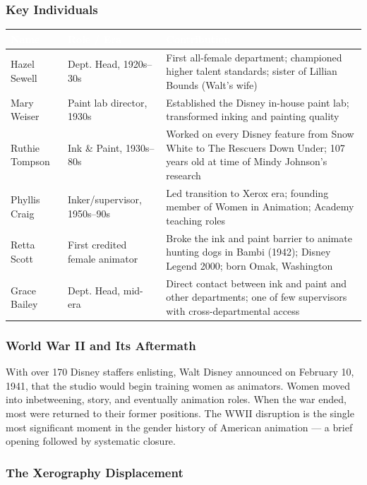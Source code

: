\documentclass[11pt,letterpaper]{article}
\newcommand{\tableheader}[1]{\textbf{\sffamily\textcolor{white}{#1}}}
\begin{document}
\subsubsection{Key Individuals}

\begin{center}
\begin{tabularx}{\textwidth}{L{3cm}L{2.5cm}X}
\toprule
{}
\tableheader{Name} & \tableheader{Role / Era} & \tableheader{Contribution} \\
\midrule
Hazel Sewell & Dept. Head, 1920s--30s & First all-female department; championed higher talent standards; sister of Lillian Bounds (Walt's wife) \\
Mary Weiser & Paint lab director, 1930s & Established the Disney in-house paint lab; transformed inking and painting quality \\
Ruthie Tompson & Ink \& Paint, 1930s--80s & Worked on every Disney feature from Snow White to The Rescuers Down Under; 107 years old at time of Mindy Johnson's research \\
Phyllis Craig & Inker/supervisor, 1950s--90s & Led transition to Xerox era; founding member of Women in Animation; Academy teaching roles \\
Retta Scott & First credited female animator & Broke the ink and paint barrier to animate hunting dogs in Bambi (1942); Disney Legend 2000; born Omak, Washington \\
Grace Bailey & Dept. Head, mid-era & Direct contact between ink and paint and other departments; one of few supervisors with cross-departmental access \\
\bottomrule
\end{tabularx}
\end{center}

\subsubsection{World War II and Its Aftermath}

With over 170 Disney staffers enlisting, Walt Disney announced on February 10, 1941, that the studio would begin training women as animators. Women moved into inbetweening, story, and eventually animation roles. When the war ended, most were returned to their former positions. The WWII disruption is the single most significant moment in the gender history of American animation --- a brief opening followed by systematic closure.

\subsubsection{The Xerography Displacement}
\end{document}

